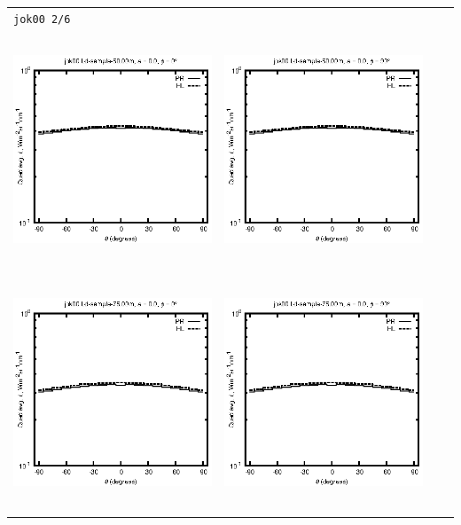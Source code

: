 \begin{tabular}{c c c c}
\multicolumn{4}{l}{\texttt{jok00 2/6}} \\
\includegraphics[height=7cm]{../eps/jok00_Ld_sample_50.00m_fwd.eps} &
\includegraphics[height=7cm]{../eps/jok00_Ld_sample_50.00m_cross.eps} \\
\includegraphics[height=7cm]{../eps/jok00_Ld_sample_75.00m_fwd.eps} &
\includegraphics[height=7cm]{../eps/jok00_Ld_sample_75.00m_cross.eps} \\

\end{tabular}
